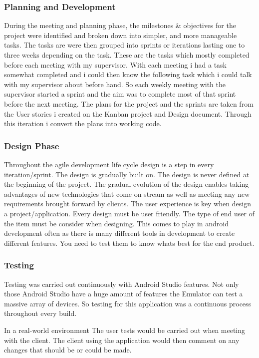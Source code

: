 \subsubsection{Planning and Development}
During the meeting and planning phase, the milestones \& objectives for the project were identified and broken down into simpler, and more manageable tasks. The tasks are were then grouped into sprints or iterations lasting one to three weeks depending on the task. These are the tasks which mostly completed before each meeting with my supervisor. With each meeting i had a task somewhat completed and i could then know the following task which i could talk with my supervisor about before hand. So each weekly meeting with the supervisor started a sprint and the aim was to complete most of that sprint before the next meeting. The plans for the project and the sprints are taken from the User stories i created on the Kanban project and Design document. Through this iteration i convert the plans into working code.

\subsubsection{Design Phase}
Throughout the agile development life cycle design is a step in every iteration/sprint. The design is gradually built on. The design is never defined at the beginning of the project. The gradual evolution of the design enables taking advantages of new technologies that come on stream as well as meeting any new requirements brought forward by clients. The user experience is key when design a project/application. Every design must be user friendly. The type of end user of the item must be consider when designing. This comes to play in android development often as there is many different tools in development to create different features. You need to test them to know whats best for the end product.

\subsubsection{Testing}
Testing was carried out continuously with Android Studio features. Not only those Android Studio have a huge amount of features the Emulator can test a massive array of devices. So testing for this application was a continuous process throughout every build.

In a real-world environment The user tests would be carried out when meeting with the client. The client using the application would then comment on any changes that should be or could be made.

